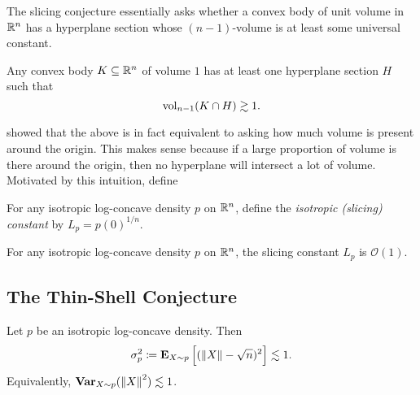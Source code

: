 \documentclass{article}
\begin{document}
		The slicing conjecture essentially asks whether a convex body of unit volume in $\mathbb{R}^n$ has a hyperplane section whose $(n-1)$-volume is at least some universal constant.

		\begin{fcon}
			Any convex body $K\subseteq\mathbb{R}^n$ of volume $1$ has at least one hyperplane section $H$ such that
			\[ \operatorname{vol}_{n-1}(K \cap H) \gtrsim 1. \]
		\end{fcon}

		\cite{slicing-conjecture-equivalent} showed that the above is in fact equivalent to asking how much volume is present around the origin. This makes sense because if a large proportion of volume is there around the origin, then no hyperplane will intersect a lot of volume.\\
		Motivated by this intuition, define

		\begin{definition}
			For any isotropic log-concave density $p$ on $\mathbb{R}^n$, define the \textit{isotropic (slicing) constant} by $L_p = p(0)^{1/n}$.
		\end{definition}

		\begin{fcon}
			\label{slicing conjecture}
			For any isotropic log-concave density $p$ on $\mathbb{R}^n$, the slicing constant $L_p$ is $\mathcal{O}(1)$.
		\end{fcon}



	\subsection{The Thin-Shell Conjecture}

		\begin{fcon}
			\label{con: thin shell conjecture}
			Let $p$ be an isotropic log-concave density. Then
			\[ \sigma_p^2 \coloneqq \textbf{E}_{X\sim p}\left[(\left\lVert X\right\rVert-\sqrt{n})^2\right] \lesssim 1. \]
			Equivalently, $\operatorname{\textbf{Var}}_{X\sim p}(\left\lVert X\right\rVert^2) \lesssim 1$.
		\end{fcon}
\end{document}
